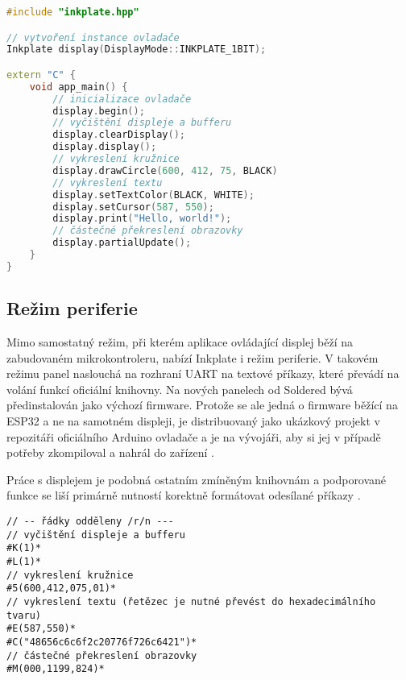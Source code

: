 \begin{lstlisting}[label=src:esp-idf-hello-world,language=C++,caption={Ukázka programu pro vykreslení kružnice a Hello World řetězce pomocí ESP-IDF knihovny}]
#include "inkplate.hpp"

// vytvoření instance ovladače
Inkplate display(DisplayMode::INKPLATE_1BIT);

extern "C" {
    void app_main() {
        // inicializace ovladače
        display.begin();
        // vyčištění displeje a bufferu
        display.clearDisplay();
        display.display();
        // vykreslení kružnice
        display.drawCircle(600, 412, 75, BLACK)
        // vykreslení textu
        display.setTextColor(BLACK, WHITE);
        display.setCursor(587, 550);
        display.print("Hello, world!");
        // částečné překreslení obrazovky
        display.partialUpdate();
    }
}
\end{lstlisting}

\subsection{Režim periferie}
Mimo samostatný režim, při kterém aplikace ovládající displej běží na zabudovaném mikrokontroleru, nabízí Inkplate i režim periferie. V takovém režimu panel naslouchá na rozhraní UART na textové příkazy, které převádí na volání funkcí oficiální knihovny. Na nových panelech od Soldered bývá předinstalován jako výchozí firmware. Protože se ale jedná o firmware běžící na ESP32 a ne na samotném displeji, je distribuovaný jako ukázkový projekt v repozitáři oficiálního Arduino ovladače a je na vývojáři, aby si jej v případě potřeby zkompiloval a nahrál do zařízení \cite{SolderedElectronicsInkplatePeripheralModeRaspberryPiExample2023}.

Práce s displejem je podobná ostatním zmíněným knihovnám a podporované funkce se liší primárně nutností korektně formátovat odesílané příkazy \cite{solderedelectronicsInkplatePeripheralMode}.

\begin{lstlisting}[label=src:PeripheralHelloWorld,caption={Ukázka příkazů pro vykreslení kružnice a Hello World řetězce v režimu periferie}]
// -- řádky odděleny /r/n ---
// vyčištění displeje a bufferu
#K(1)*
#L(1)*
// vykreslení kružnice
#5(600,412,075,01)*
// vykreslení textu (řetězec je nutné převést do hexadecimálního tvaru)
#E(587,550)*
#C("48656c6c6f2c20776f726c6421")*
// částečné překreslení obrazovky
#M(000,1199,824)*
\end{lstlisting}
